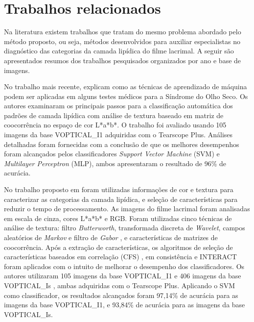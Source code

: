\chapter{Trabalhos relacionados}
\phantom{0}
\label{sec:trabRelacionados}

Na literatura existem trabalhos que tratam do mesmo problema abordado pelo método proposto, ou seja, métodos desenvolvidos para auxiliar especialistas no diagnóstico das categorias da camada lipídica do filme lacrimal. A seguir são apresentados resumos dos trabalhos pesquisados organizados por ano e base de imagens.

No trabalho mais recente,  explicam como as técnicas de aprendizado de máquina podem ser aplicadas em alguns testes médicos para a Síndrome do Olho Seco. Os autores examinaram os principais passos para a classificação automática dos padrões de camada lipídica com análise de textura baseado em matriz de coocorrência no espaço de cor L*a*b*. O trabalho foi avaliado usando 105 imagens da base VOPTICAL\_I1 adquiridas com o Tearscope Plus. Análises detalhadas foram fornecidas com a conclusão de que os melhores desempenhos foram alcançados pelos classificadores \textit{Support Vector Machine} (SVM) e \textit{Multilayer Perceptron} (MLP), ambos apresentaram o resultado de 96\% de acurácia.

No trabalho proposto em  foram utilizadas informações de cor e textura para caracterizar as categorias da camada lipídica, e seleção de características para reduzir o tempo de processamento. As imagens do filme lacrimal foram analisadas em escala de cinza, cores L*a*b* e RGB. Foram utilizadas cinco técnicas de análise de textura: filtro \textit{Butterworth}, transformada discreta de \textit{Wavelet}, campos aleatórios de \textit{Markov} e filtro de \textit{Gabor} \cite{ccesmeli2001texture}, e características de matrizes de coocorrência. Após a extração de características, os algoritmos de seleção de características baseados em correlação (CFS) \cite{hall1999correlation}, em consistência \cite{dash2003consistency} e INTERACT \cite{zhao2007searching} foram aplicados com o intuito de melhorar o desempenho dos classificadores. Os autores utilizaram 105 imagens da base VOPTICAL\_I1 \cite{voptical_gcuvarpa_i1} e 406 imagens da base VOPTICAL\_Is \cite{voptical_gcuvarpa_is}, ambas adquiridas com o Tearscope Plus. Aplicando o SVM como classificador, os resultados alcançados foram 97,14\% de acurácia para as imagens da base VOPTICAL\_I1, e 93,84\% de acurácia para as imagens da base VOPTICAL\_Is.

